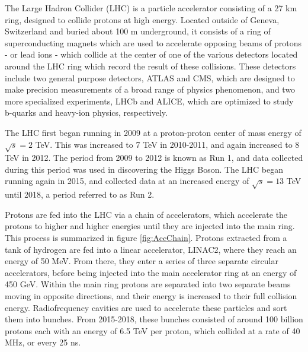 The Large Hadron Collider (LHC) is a particle accelerator consisting of a 27 km ring, designed to collide protons at high energy. Located outside of Geneva, Switzerland and buried about 100 m underground, it consists of a ring of superconducting magnets which are used to accelerate opposing beams of protons - or lead ions - which collide at the center of one of the various detectors located around the LHC ring which record the result of these collisions. These detectors include two general purpose detectors, ATLAS and CMS, which are designed to make precision measurements of a broad range of physics phenomenon, and two more specialized experiments, LHCb and ALICE, which are optimized to study b-quarks and heavy-ion physics, respectively.

The LHC first began running in 2009 at a proton-proton center of mass energy of $\sqrt{s} = 2$ TeV. This was increased to 7 TeV in 2010-2011, and again increased to 8 TeV in 2012. The period from 2009 to 2012 is known as Run 1, and data collected during this period was used in discovering the Higgs Boson. The LHC began running again in 2015, and collected data at an increased energy of $\sqrt{s} = 13$ TeV until 2018, a period referred to as Run 2. 

Protons are fed into the LHC via a chain of accelerators, which accelerate the protons to higher and higher energies until they are injected into the main ring. This process is summarized in figure \ref{fig:AccChain}. Protons extracted from a tank of hydrogen are fed into a linear accelerator, LINAC2, where they reach an energy of 50 MeV. From there, they enter a series of three separate circular accelerators, before being injected into the main accelerator ring at an energy of 450 GeV. Within the main ring protons are separated into two separate beams moving in opposite directions, and their energy is increased to their full collision energy. Radiofrequency cavities are used to accelerate these particles and sort them into bunches. From 2015-2018, these bunches consisted of around 100 billion protons each with an energy of 6.5 TeV per proton, which collided at a rate of 40 MHz, or every 25 ns. 

